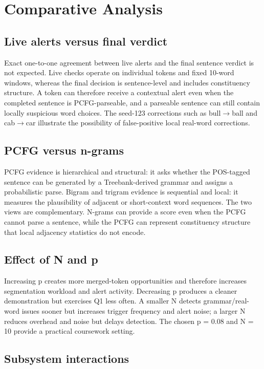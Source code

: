 \documentclass[11pt]{article}
\begin{document}
\section{Comparative Analysis}

\subsection{Live alerts versus final verdict}

Exact one-to-one agreement between live alerts and the final sentence verdict is not expected. Live checks operate on individual tokens and fixed 10-word windows, whereas the final decision is sentence-level and includes constituency structure. A token can therefore receive a contextual alert even when the completed sentence is PCFG-parseable, and a parseable sentence can still contain locally suspicious word choices. The seed-123 corrections such as bull$\rightarrow$ball and cab$\rightarrow$car illustrate the possibility of false-positive local real-word corrections.

\subsection{PCFG versus n-grams}

PCFG evidence is hierarchical and structural: it asks whether the POS-tagged sentence can be generated by a Treebank-derived grammar and assigns a probabilistic parse. Bigram and trigram evidence is sequential and local: it measures the plausibility of adjacent or short-context word sequences. The two views are complementary. N-grams can provide a score even when the PCFG cannot parse a sentence, while the PCFG can represent constituency structure that local adjacency statistics do not encode.

\subsection{Effect of N and p}

Increasing p creates more merged-token opportunities and therefore increases segmentation workload and alert activity. Decreasing p produces a cleaner demonstration but exercises Q1 less often. A smaller N detects grammar/real-word issues sooner but increases trigger frequency and alert noise; a larger N reduces overhead and noise but delays detection. The chosen p = 0.08 and N = 10 provide a practical coursework setting.

\subsection{Subsystem interactions}
\end{document}
